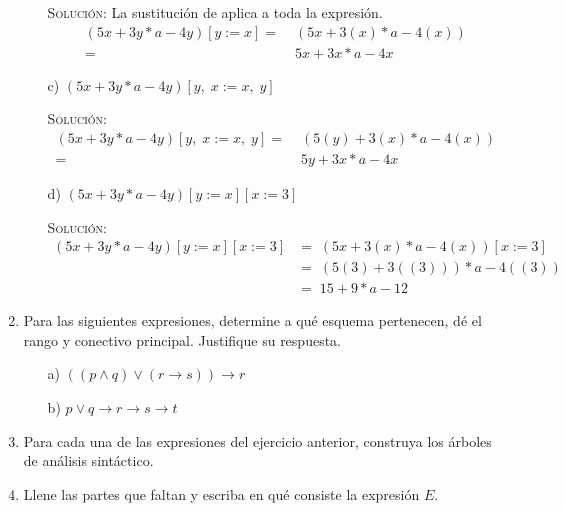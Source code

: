 \documentclass[letterpaper,11pt]{article}
\begin{document}
\begin{enumerate}
\begin{itemize}
        \textsc{Solución:} La sustitución de aplica a toda la expresión.
        \begin{align*}
            (5x + 3y * a - 4y)[y := x]
            =& \; (5x + 3(x) * a - 4(x)) \\
            =& \; 5x + 3x * a - 4x    
        \end{align*}

        \item[c)] $(5x + 3y * a - 4y)[y, \; x := x, \;y]$

        \textsc{Solución:}
        \begin{align*}
            (5x + 3y * a - 4y)[y, \; x := x, \;y]
            =& \; (5(y) + 3(x) * a - 4(x)) \\ 
            =& \; 5y + 3x * a - 4x
        \end{align*}

        \item[d)] $(5x + 3y * a - 4y)[y := x][x := 3]$

        \textsc{Solución:}
        \begin{align*}
            (5x + 3y * a - 4y)[y := x][x := 3]
            &= \; (5x + 3(x) * a - 4(x))[x :=3] \\ 
            &= \; (5(3) + 3((3))) * a - 4((3)) \\ 
            &= \; 15 + 9 * a - 12
        \end{align*}
    \end{itemize}

    \item Para las siguientes expresiones, determine a qué esquema pertenecen,
    dé el rango y conectivo principal. Justifique su respuesta.

    \begin{itemize}
        \item[a)] $((p \land q) \lor (r → s)) → r$
        \item[b)] $p \lor q → r → s → t$
    \end{itemize}

    \item Para cada una de las expresiones del ejercicio anterior, construya
    los árboles de análisis sintáctico.

    \item Llene las partes que faltan y escriba en qué consiste la expresión 
    $E$.


\end{enumerate}
\end{document}
